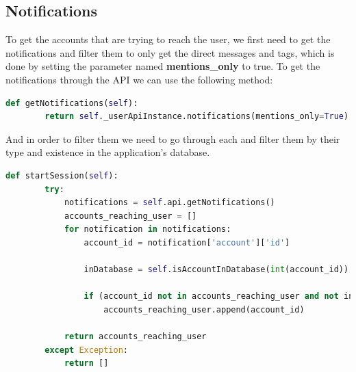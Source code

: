 \subsection{Notifications}\label{ss:notif}
To get the accounts that are trying to reach the user, we first need to get the notifications and filter them to only get the direct messages and tags, which is done
by setting the parameter named \textbf{mentions\_only} to true.
To get the notifications through the API we can use the following method:
\\[5pt]
\begin{lstlisting}[language=python, caption={Getting the notifications by API}, captionpos=b]
	def getNotifications(self):
		return self._userApiInstance.notifications(mentions_only=True)
\end{lstlisting}
And in order to filter them we need to go through each and filter them by their type and existence in the application's database.
\\[5pt]
\begin{lstlisting}[language=python, caption={Filtering the notifications}, captionpos=b]
	def startSession(self):
		try:
			notifications = self.api.getNotifications()
			accounts_reaching_user = []
			for notification in notifications:
				account_id = notification['account']['id']
				
				inDatabase = self.isAccountInDatabase(int(account_id))
		
				if (account_id not in accounts_reaching_user and not inDatabase):
					accounts_reaching_user.append(account_id)
	
			return accounts_reaching_user
		except Exception:
			return []
\end{lstlisting}
